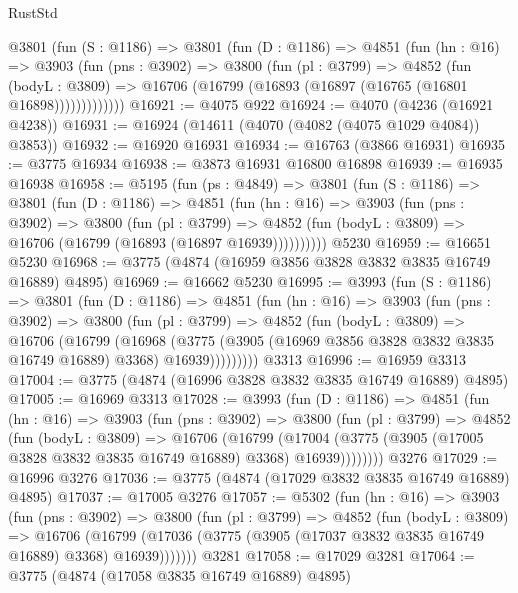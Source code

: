 \begin{lexlean}{RustStd}
\begin{coremodule}
      @3801
        (fun (S : @1186) =>
        @3801
          (fun (D : @1186) =>
          @4851
            (fun (hn : @16) =>
            @3903
              (fun (pns : @3902) =>
              @3800
                (fun (pl : @3799) =>
                @4852
                  (fun (bodyL : @3809) =>
                  @16706 (@16799 (@16893 (@16897 (@16765 (@16801 @16898)))))))))))))
@16921 := @4075 @922
@16924 := @4070 (@4236 (@16921 @4238))
@16931 := @16924 (@14611 (@4070 (@4082 (@4075 @1029 @4084)) @3853))
@16932 := @16920 @16931
@16934 := @16763 (@3866 @16931)
@16935 := @3775 @16934
@16938 := @3873 @16931 @16800 @16898
@16939 := @16935 @16938
@16958 := @5195
    (fun (ps : @4849) =>
    @3801
      (fun (S : @1186) =>
      @3801
        (fun (D : @1186) =>
        @4851
          (fun (hn : @16) =>
          @3903
            (fun (pns : @3902) =>
            @3800
              (fun (pl : @3799) =>
              @4852 (fun (bodyL : @3809) => @16706 (@16799 (@16893 (@16897 @16939))))))))))
    @5230
@16959 := @16651 @5230
@16968 := @3775 (@4874 (@16959 @3856 @3828 @3832 @3835 @16749 @16889) @4895)
@16969 := @16662 @5230
@16995 := @3993
    (fun (S : @1186) =>
    @3801
      (fun (D : @1186) =>
      @4851
        (fun (hn : @16) =>
        @3903
          (fun (pns : @3902) =>
          @3800
            (fun (pl : @3799) =>
            @4852
              (fun (bodyL : @3809) =>
              @16706
                (@16799
                  (@16968
                    (@3775
                      (@3905 (@16969 @3856 @3828 @3832 @3835 @16749 @16889) @3368)
                      @16939)))))))))
    @3313
@16996 := @16959 @3313
@17004 := @3775 (@4874 (@16996 @3828 @3832 @3835 @16749 @16889) @4895)
@17005 := @16969 @3313
@17028 := @3993
    (fun (D : @1186) =>
    @4851
      (fun (hn : @16) =>
      @3903
        (fun (pns : @3902) =>
        @3800
          (fun (pl : @3799) =>
          @4852
            (fun (bodyL : @3809) =>
            @16706
              (@16799
                (@17004 (@3775 (@3905 (@17005 @3828 @3832 @3835 @16749 @16889) @3368) @16939))))))))
    @3276
@17029 := @16996 @3276
@17036 := @3775 (@4874 (@17029 @3832 @3835 @16749 @16889) @4895)
@17037 := @17005 @3276
@17057 := @5302
    (fun (hn : @16) =>
    @3903
      (fun (pns : @3902) =>
      @3800
        (fun (pl : @3799) =>
        @4852
          (fun (bodyL : @3809) =>
          @16706
            (@16799 (@17036 (@3775 (@3905 (@17037 @3832 @3835 @16749 @16889) @3368) @16939)))))))
    @3281
@17058 := @17029 @3281
@17064 := @3775 (@4874 (@17058 @3835 @16749 @16889) @4895)

\end{coremodule}
\end{lexlean}
